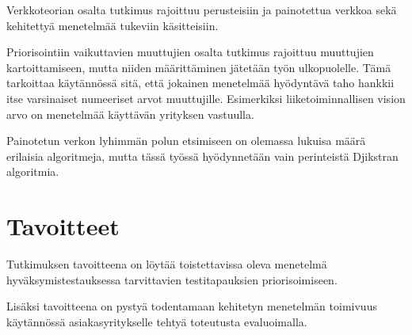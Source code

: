 Verkkoteorian osalta tutkimus rajoittuu perusteisiin ja painotettua verkkoa sekä kehitettyä menetelmää tukeviin käsitteisiin.

Priorisointiin vaikuttavien muuttujien osalta tutkimus rajoittuu muuttujien kartoittamiseen, mutta niiden määrittäminen jätetään työn ulkopuolelle. Tämä tarkoittaa käytännössä sitä, että jokainen menetelmää hyödyntävä taho hankkii itse varsinaiset numeeriset arvot muuttujille. Esimerkiksi liiketoiminnallisen vision arvo on menetelmää käyttävän yrityksen vastuulla.

Painotetun verkon lyhimmän polun etsimiseen on olemassa lukuisa määrä erilaisia algoritmeja, mutta tässä työssä hyödynnetään vain perinteistä Djikstran algoritmia.

\section{Tavoitteet}

Tutkimuksen tavoitteena on löytää toistettavissa oleva menetelmä hyväksymistestauksessa tarvittavien testitapauksien priorisoimiseen.

Lisäksi tavoitteena on pystyä todentamaan kehitetyn menetelmän toimivuus käytännössä asiakasyritykselle tehtyä toteutusta evaluoimalla.
